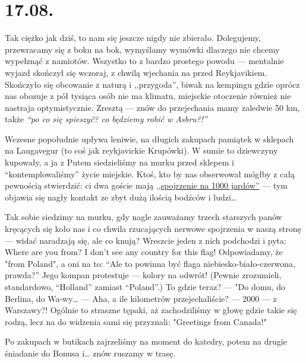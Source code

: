 \chapter*{17.08.}

Tak ciężko jak dziś, to nam się jeszcze nigdy nie zbierało. Dolegujemy, przewracamy się z boku na bok, wymyślamy wymówki dlaczego nie chcemy wypełznąć z namiotów. Wszystko to z bardzo prostego powodu --- mentalnie wyjazd skończył się wczoraj, z chwilą wjechania na  przed Reykjavikiem. Skończyło się obcowanie z naturą i ,,przygoda'', biwak na kempingu gdzie oprócz nas obozuje z pół tysiąca osób nie ma klimatu, miejsckie otoczenie również nie nastraja optymistycznie. Zresztą --- znów do przejechania mamy zaledwie 50 km, także \emph{“po co się spieszyć? co będziemy robić w Asbru?!”}

Wczesne popołudnie upływa leniwie, na długich zakupach pamiątek w sklepach na Laugavegur (to coś jak reykjavickie Krupówki). W sumie to dziewczyny kupowały, a ja z Putem siedzieliśmy na murku przed sklepem i “kontemplowaliśmy” życie miejskie. Ktoś, kto by nas obserwował mógłby z całą pewnością stwierdzić: ci dwa goście mają \href{http://en.wikipedia.org/wiki/Thousand-yard_stare}{,,spojrzenie na 1000 jardów''} --- tym objawia się nagły kontakt ze zbyt dużą ilością bodźców i ludzi…


Tak sobie siedzimy na murku, gdy nagle zauważamy trzech starszych panów kręcących się koło nas i co chwila rzucających nerwowe spojrzenia w naszą stronę --- widać naradzają się, ale co knują? Wreszcie jeden z nich podchodzi i pyta: Where are you from? I don’t see any country for this flag! Odpowiadamy, że "from Poland", a oni na to: “Ale to powinna być flaga niebiesko-biało-czerwona, prawda?” Jego kompan protestuje --- kolory na odwrót! (Pewnie zrozumieli, standardowo, “Holland” zamiast “Poland”.) To gdzie teraz? --- "Do domu, do Berlina, do Wa-wy… --- Aha, a ile kilometrów przejechaliście? --- 2000 --- z Warszawy?! Ogólnie to straszne tępaki, aż zachodziliśmy w głowę gdzie takie się rodzą, lecz na do widzenia sami się przyznali: "Greetings from Canada!"

Po zakupach w butikach zajrzeliśmy na moment do katedry, potem na drugie śniadanie do Bonusa i… znów ruszamy w trasę.

